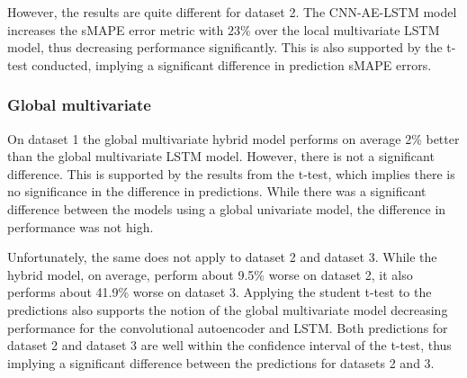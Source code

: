 However, the results are quite different for dataset 2.
The CNN-AE-LSTM model increases the sMAPE error metric with $23\%$ over the local multivariate LSTM model, thus decreasing performance significantly.
This is also supported by the t-test conducted, implying a significant difference in prediction sMAPE errors.




\subsubsection{Global multivariate}
\label{section:discussion&results:experiment-results:CNN-AE-LSTM:Global-Multivariate}
On dataset 1 the global multivariate hybrid model performs on average 2\% better than the global multivariate LSTM model. However, there is not a significant difference.
This is supported by the results from the t-test, which implies there is no significance in the difference in predictions.
While there was a significant difference between the models using a global univariate model, the difference in performance was not high.


Unfortunately, the same does not apply to dataset 2 and dataset 3.
While the hybrid model, on average, perform about 9.5\% worse on dataset 2, it also performs about 41.9\% worse on dataset 3.
Applying the student t-test to the predictions also supports the notion of the global multivariate model decreasing performance for the
convolutional autoencoder and LSTM.
Both predictions for dataset 2 and dataset 3 are well within the confidence interval of the t-test,
thus implying a significant difference between the predictions for datasets 2 and 3.



